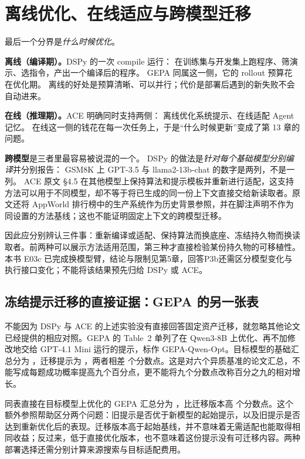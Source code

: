 \section{离线优化、在线适应与跨模型迁移}
\label{sec:ch07-offline}

最后一个分界是\emph{什么时候优化}。

\textbf{离线（编译期）。}DSPy 的一次 compile 运行：
在训练集与开发集上跑程序、筛演示、选指令，产出一个编译后的程序\cite{dspy-2310}。
GEPA 同属这一侧，它的 rollout 预算花在优化期\cite{gepa-2507}。
离线的好处是预算清晰、可以并行；代价是部署后遇到的新失败不会自动进来。

\textbf{在线（推理期）。}ACE 明确同时支持两侧：
离线优化系统提示、在线适配 Agent 记忆\cite{ace-2510}。
在线这一侧的钱花在每一次任务上，于是``什么时候更新''变成了第 13 章的问题。

\textbf{跨模型}是三者里最容易被说混的一个。
DSPy 的做法是\emph{针对每个基础模型分别编译}并分别报告：
GSM8K 上 GPT-3.5 与 llama2-13b-chat 的数字是两列，不是一列\cite{dspy-2310}。
ACE 原文 §4.5 在其他模型上保持算法和提示模板并重新进行适配，这支持方法可以用于不同模型，却不等于将已生成的同一份上下文直接交给新读取者。原文还将 AppWorld 排行榜中的生产系统作为历史背景参照，并在脚注声明不作为同设置的方法基线\cite{ace-2510}；这也不能证明固定上下文的跨模型迁移。

因此应分别辨认三件事：重新编译或适配、保持算法而换底座、冻结持久物而换读取者。前两种可以展示方法适用范围，第三种才直接检验某份持久物的可移植性。本书 E03c 已完成换模型臂，结论与限制见第5章，回答P3b还需区分模型变化与执行接口变化；不能将该结果预先归给 DSPy 或 ACE。

\subsection{冻结提示迁移的直接证据：GEPA 的另一张表}

不能因为 DSPy 与 ACE 的上述实验没有直接回答固定资产迁移，就忽略其他论文已经提供的相应对照。GEPA 的 Table~2 单列了在 Qwen3-8B 上优化、再不加修改地交给 GPT-4.1 Mini 运行的提示，标作 GEPA-Qwen-Opt。目标模型的基础汇总分为 ，迁移提示为 ，两者相差  个分数点\cite{gepa-2507}。这是对六个异质基准的论文汇总，不能写成每题成功概率提高九个百分点，更不能将九个分数点改称百分之九的相对增长。

同表直接在目标模型上优化的 GEPA 汇总分为 ，比迁移版本高  个分数点。这个额外参照帮助区分两个问题：旧提示是否优于新模型的起始提示，以及旧提示是否达到重新优化后的表现。迁移版本高于起始基线，并不意味着无需适配也能取得相同收益；反过来，低于直接优化版本，也不意味着这份提示没有可迁移内容。两种部署选择还需分别计算来源搜索与目标适配费用。

